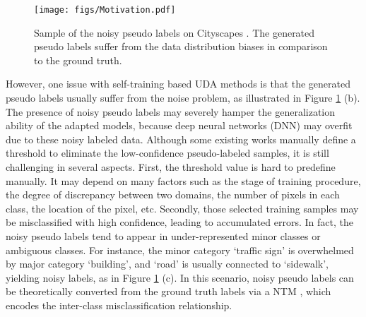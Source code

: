 \documentclass[final]{cvpr}
\begin{document}
\begin{figure}[t]
\centering
\texttt{[image: figs/Motivation.pdf]}
\caption{Sample of the noisy pseudo labels on Cityscapes \cite{cordts2016cityscapes}. The generated pseudo labels suffer from the data distribution biases in comparison to the ground truth.}
\vspace{-0.4cm}
\label{fig:Motivation}
\end{figure}

However, one issue with self-training based UDA methods is that the generated pseudo labels usually suffer from the noise problem, as illustrated in Figure \ref{fig:Motivation} (b). The presence of noisy pseudo labels may severely hamper the generalization ability of the adapted models, because deep neural networks (DNN) may overfit due to these noisy labeled data. Although some existing works \cite{guo2020semi, lian2019constructing, zou2018unsupervised} manually define a threshold to eliminate the low-confidence pseudo-labeled samples, it is still challenging in several aspects. First, the threshold value is hard to predefine manually. It may depend on many factors such as the stage of training procedure, the degree of discrepancy between two domains, the number of pixels in each class, the location of the pixel, etc. Secondly, those selected training samples may be misclassified with high confidence, leading to accumulated errors. In fact, the noisy pseudo labels tend to appear in under-represented minor classes or ambiguous classes. For instance, the minor category `traffic sign' is overwhelmed by major category `building', and `road' is usually connected to `sidewalk', yielding noisy labels, as in Figure \ref{fig:Motivation} (c). In this scenario, noisy pseudo labels can be theoretically converted from the ground truth labels via a NTM \cite{shu2020meta, zhang2020distilling}, which encodes the inter-class misclassification relationship. 
\end{document}
